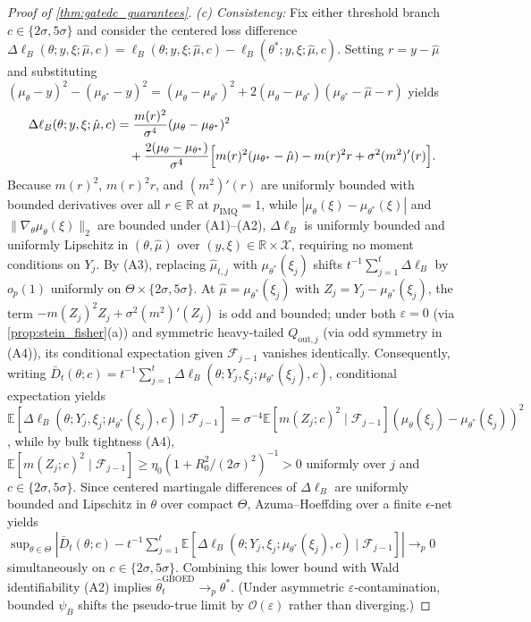 \documentclass[11pt,a4paper,reqno]{amsart}
\theoremstyle{definition}
\theoremstyle{remark}
\newcommand{\R}{\mathbb{R}}
\newcommand{\E}{\mathbb{E}}
\newcommand{\Xcal}{\mathcal{X}}
\begin{document}
\begin{proof}[Proof of \cref{thm:gatedc_guarantees}]
\emph{(c) Consistency:} Fix either threshold branch $c \in \{2\sigma, 5\sigma\}$ and consider the centered loss difference $\Delta\ell_B(\theta; y, \xi; \hat{\mu}, c) = \ell_B(\theta; y, \xi; \hat{\mu}, c) - \ell_B(\theta^*; y, \xi; \hat{\mu}, c)$. Setting $r = y - \hat{\mu}$ and substituting $(\mu_\theta - y)^2 - (\mu_{\theta^*} - y)^2 = (\mu_\theta - \mu_{\theta^*})^2 + 2(\mu_\theta - \mu_{\theta^*})(\mu_{\theta^*} - \hat{\mu} - r)$ yields
\begin{align*}
\Delta\ell_B(\theta; y, \xi; \hat{\mu}, c)
&= \frac{m(r)^2}{\sigma^4}(\mu_\theta - \mu_{\theta^*})^2 \\
&\quad + \frac{2(\mu_\theta - \mu_{\theta^*})}{\sigma^4}\Bigl[m(r)^2(\mu_{\theta^*} - \hat{\mu}) - m(r)^2 r + \sigma^2 (m^2)'(r)\Bigr].
\end{align*}
Because $m(r)^2$, $m(r)^2 r$, and $(m^2)'(r)$ are uniformly bounded with bounded derivatives over all $r \in \R$ at $p_{\mathrm{IMQ}}=1$, while $|\mu_\theta(\xi) - \mu_{\theta^*}(\xi)|$ and $\|\nabla_\theta\mu_\theta(\xi)\|_2$ are bounded under (A1)--(A2), $\Delta\ell_B$ is uniformly bounded and uniformly Lipschitz in $(\theta, \hat{\mu})$ over $(y, \xi) \in \R \times \Xcal$, requiring no moment conditions on $Y_j$. By (A3), replacing $\hat{\mu}_{t,j}$ with $\mu_{\theta^*}(\xi_j)$ shifts $t^{-1}\sum_{j=1}^t \Delta\ell_B$ by $o_p(1)$ uniformly on $\Theta \times \{2\sigma, 5\sigma\}$. At $\hat{\mu} = \mu_{\theta^*}(\xi_j)$ with $Z_j = Y_j - \mu_{\theta^*}(\xi_j)$, the term $-m(Z_j)^2 Z_j + \sigma^2 (m^2)'(Z_j)$ is odd and bounded; under both $\varepsilon = 0$ (via \cref{prop:stein_fisher}(a)) and symmetric heavy-tailed $Q_{\mathrm{out},j}$ (via odd symmetry in (A4)), its conditional expectation given $\mathcal{F}_{j-1}$ vanishes identically. Consequently, writing $\bar{D}_t(\theta; c) = t^{-1}\sum_{j=1}^t \Delta\ell_B(\theta; Y_j, \xi_j; \mu_{\theta^*}(\xi_j), c)$, conditional expectation yields $\E[\Delta\ell_B(\theta; Y_j, \xi_j; \mu_{\theta^*}(\xi_j), c) \mid \mathcal{F}_{j-1}] = \sigma^{-4}\E[m(Z_j; c)^2 \mid \mathcal{F}_{j-1}](\mu_\theta(\xi_j) - \mu_{\theta^*}(\xi_j))^2$, while by bulk tightness (A4), $\E[m(Z_j; c)^2 \mid \mathcal{F}_{j-1}] \ge \eta_0(1 + R_0^2/(2\sigma)^2)^{-1} > 0$ uniformly over $j$ and $c \in \{2\sigma, 5\sigma\}$. Since centered martingale differences of $\Delta\ell_B$ are uniformly bounded and Lipschitz in $\theta$ over compact $\Theta$, Azuma--Hoeffding over a finite $\epsilon$-net yields $\sup_{\theta \in \Theta} |\bar{D}_t(\theta; c) - t^{-1}\sum_{j=1}^t \E[\Delta\ell_B(\theta; Y_j, \xi_j; \mu_{\theta^*}(\xi_j), c) \mid \mathcal{F}_{j-1}]| \to_p 0$ simultaneously on $c \in \{2\sigma, 5\sigma\}$. Combining this lower bound with Wald identifiability (A2) implies $\hat{\theta}_t^{\mathrm{GBOED}} \to_p \theta^*$. (Under asymmetric $\varepsilon$-contamination, bounded $\psi_B$ shifts the pseudo-true limit by $\mathcal{O}(\varepsilon)$ rather than diverging.)


\end{proof}
\end{document}

